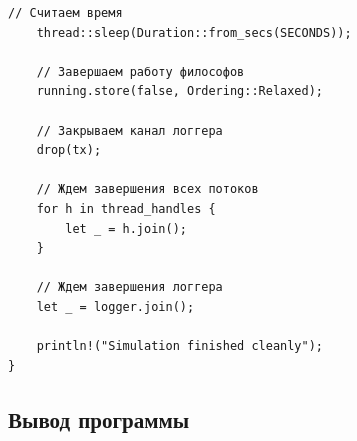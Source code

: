 \documentclass[a4paper, 14pt]{extarticle}
\begin{document}
\begin{lstlisting}[caption={Исходный код программы}, label={lst:source_code}]
    // Считаем время
    thread::sleep(Duration::from_secs(SECONDS));

    // Завершаем работу философов
    running.store(false, Ordering::Relaxed);

    // Закрываем канал логгера
    drop(tx);

    // Ждем завершения всех потоков
    for h in thread_handles {
        let _ = h.join();
    }

    // Ждем завершения логгера
    let _ = logger.join();

    println!("Simulation finished cleanly");
}
\end{lstlisting}

\subsection*{Вывод программы}\label{Subsect::program_output}
\end{document}
